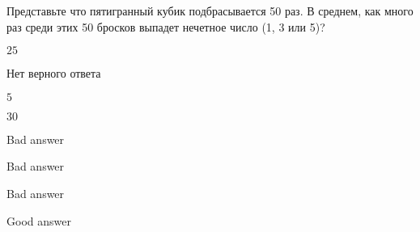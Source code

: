 
\begin{question}
Представьте что пятигранный кубик подбрасывается 50 раз.
В среднем, как много раз среди этих 50 бросков выпадет нечетное число (1, 3 или 5)?
\begin{answerlist}
  \item \(25\)
  \item Нет верного ответа
  \item \(5\)
  \item \(30\)
\end{answerlist}
\end{question}

\begin{solution}
\begin{answerlist}
  \item Bad answer
  \item Bad answer
  \item Bad answer
  \item Good answer
\end{answerlist}
\end{solution}

